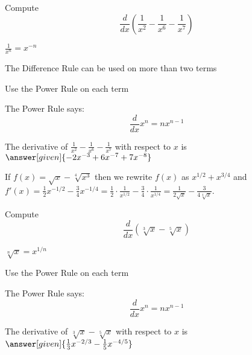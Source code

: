 \documentclass{ximera}
\begin{document}
\begin{problem} %
  Compute 
  \[
  \frac{d}{dx} \left(\frac{1}{x^2} - \frac{1}{x^6} - \frac{1}{x^7}\right)
  \]
  
    \begin{hint}
		 $\frac{1}{x^n} = x^{-n}$
		\end{hint}
		\begin{hint}
		  The Difference Rule can be used on more than two terms
		\end{hint}
		\begin{hint}
      Use the Power Rule on each term
    \end{hint}
    \begin{hint}
      The Power Rule says:
      \[
      \frac{d}{dx} x^n = nx^{n-1}
      \]
    \end{hint}    
		The derivative of $\frac{1}{x^2} - \frac{1}{x^6} - \frac{1}{x^7}$ with respect to $x$ is
		 $\answer[given]{-2x^{-3} + 6x^{-7} + 7x^{-8}}$
	
\end{problem}


\begin{example} %
 If $f(x) = \sqrt x - \sqrt[4] {x^3}$ then we rewrite $f(x)$ as $x^{1/2} + x^{3/4}$ and
$f'(x) = \tfrac12 x^{-1/2} - \tfrac34 x^{-1/4} = \tfrac12 \cdot \frac{1}{x^{1/2}} - \tfrac34 \cdot \frac{1}{x^{1/4}} 
= \frac{1}{2\sqrt x} - \frac{3}{4\sqrt[4] x}$.
\end{example}


\begin{problem} %
  Compute 
  \[
  \frac{d}{dx} \left(\sqrt[3] x - \sqrt[5] x\right)
  \]
  
    \begin{hint}
		 $\sqrt[n] x = x^{1/n}$
		\end{hint}
		\begin{hint}
      Use the Power Rule on each term
    \end{hint}
    \begin{hint}
      The Power Rule says:
      \[
      \frac{d}{dx} x^n = nx^{n-1}
      \]
    \end{hint}    
		The derivative of $\sqrt[3] x - \sqrt[5] x$ with respect to $x$ is
		 $\answer[given]{\frac13 x^{-2/3} - \frac15 x^{-4/5}}$
	
\end{problem}
\end{document}

